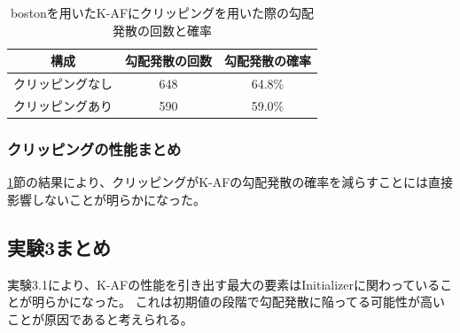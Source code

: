 \begin{table}[htbp]
    \begin{center}
        \caption{bostonを用いたK-AFにクリッピングを用いた際の勾配発散の回数と確率}
        \label{clipping_boston}
        \vspace{2mm} 
        \begin{tabular}{ |c|c|c| }
        \hline
        構成 & 勾配発散の回数 & 勾配発散の確率\\
        \hline
        クリッピングなし  & 648 & 64.8\% \\
        \hline
        クリッピングあり  & 590 & 59.0\% \\
        \hline
        \end{tabular}
    \end{center}
\end{table}



\subsubsection{クリッピングの性能まとめ}
\ref{clipping_boston}節の結果により、クリッピングがK-AFの勾配発散の確率を減らすことには直接影響しないことが明らかになった。



\subsection{実験3まとめ}
実験3.1により、K-AFの性能を引き出す最大の要素はInitializerに関わっていることが明らかになった。
これは初期値の段階で勾配発散に陥ってる可能性が高いことが原因であると考えられる。


